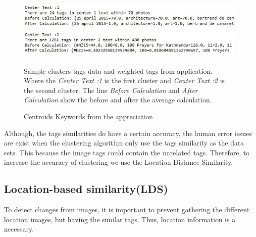 \documentclass[runningheads,a4paper]{llncs}
\newcommand{\naoki}{\todo[author=NK,color=yellow,inline]}
\begin{document}
\begin{figure}[h]
	\centering
	\includegraphics[width=50cm,bb=0 0 1820 73]{centroid.jpg}
	\includegraphics[width=50cm,bb=0 0 1820 73]{centroid2.jpg}
	\caption{Centroids Keywords from the appreciation}
	{\footnotesize Sample clusters tags data and weighted tags from application. Where the \textit{Center Text :1} is the first cluster and \textit{Center Text :2} is the second cluster. The line \textit{Before Calculation} and \textit{After Calculation} show the before and after the average calculation.}
\end{figure}

Although, the tags similarities do have a certain accuracy, the human error issues are exist when the clustering algorithm only use the tags similarity as the data sets. This because the image tags could contain the unrelated tags. Therefore, to increase the accuracy of clustering we use the Location Distance Similarity.

\naoki{The change end }
\subsection{Location-based similarity(LDS)} 

To detect changes from images, it is important to prevent gathering the different location images, but having the similar tags.
Thus, location information is a necessary. 

%
%
\end{document}
